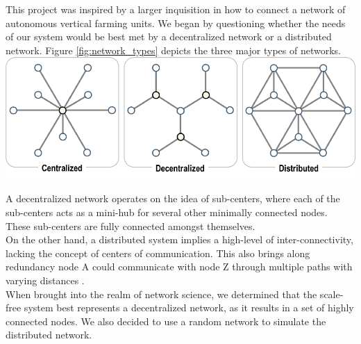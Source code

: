 \documentclass[journal]{IEEEtran}
\begin{document}
\noindent This project was inspired by a larger inquisition in how to connect a network of autonomous vertical farming units. We began by questioning whether the needs of our system would be best met by a decentralized network or a distributed network. Figure \ref{fig:network_types} depicts the three major types of networks. \\

\begingroup
    \centering
    \medskip
    \includegraphics[width=\columnwidth]{images/network-structures.png}
    \label{fig:network_types}
    \medskip
\endgroup

\noindent A decentralized network operates on the idea of sub-centers, where each of the sub-centers acts as a mini-hub for several other minimally connected nodes. These sub-centers are fully connected amongst themselves. \\

\noindent On the other hand, a distributed system implies a high-level of inter-connectivity, lacking the concept of centers of communication. This also brings along redundancy \emdash node A could communicate with node Z through multiple paths with varying distances \cite{Network_Structure_2017}. \\

\noindent When brought into the realm of network science, we determined that the scale-free system best represents a decentralized network, as it results in a set of highly connected nodes. We also decided to use a random network to simulate the distributed network. 




\end{document}
